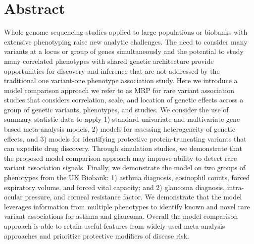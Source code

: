\section*{Abstract}
Whole genome sequencing studies applied to large populations or biobanks with extensive phenotyping raise new analytic challenges. The need to consider many variants at a locus or group of genes simultaneously and the potential to study many correlated phenotypes with shared genetic architecture provide opportunities for discovery and inference that are not addressed by the traditional one variant-one phenotype association study. Here we introduce a model comparison approach we refer to as MRP for rare variant association studies that considers correlation, scale, and location of genetic effects across a group of genetic variants, phenotypes, and studies. We consider the use of summary statistic data to apply 1) standard univariate and multivariate gene-based meta-analysis models, 2) models for assessing heterogeneity of genetic effects, and 3) models for identifying protective protein-truncating variants that can expedite drug discovery.  Through simulation studies, we demonstrate that the proposed model comparison approach may improve ability to detect rare variant association signals. Finally, we demonstrate the model on two groups of phenotypes from the UK Biobank: 1) asthma diagnosis, eosinophil counts, forced expiratory volume, and forced vital capacity; and 2) glaucoma diagnosis, intra-ocular pressure, and corneal resistance factor. We demonstrate that the model leverages information from multiple phenotypes to identify known and novel rare variant associations for asthma and glaucoma. Overall the model comparison approach is able to retain useful features from widely-used meta-analysis approaches and prioritize protective modifiers of disease risk.

